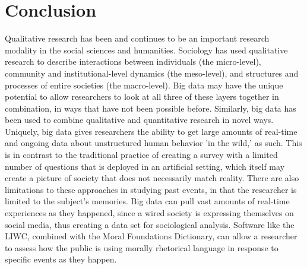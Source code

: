 \documentclass[sigconf]{acmart}
\begin{document}
\section{Conclusion}
Qualitative research has been and continues to be an important research modality in the social sciences and humanities.  Sociology has used qualitative research to describe interactions between individuals (the micro-level), community and institutional-level dynamics (the meso-level), and structures and processes of entire societies (the macro-level).  Big data may have the unique potential to allow researchers to look at all three of these layers together in combination, in ways that have not been possible before. Similarly, big data has been used to combine qualitative and quantitative research in novel ways.  Uniquely, big data gives researchers the ability to get large amounts of real-time and ongoing data about unstructured human behavior 'in the wild,' as such.  This is in contrast to the traditional practice of creating a survey with a limited number of questions that is deployed in an artificial setting, which itself may create a picture of society that does not necessarily match reality.  There are also limitations to these approaches in studying past events, in that the researcher is limited to the subject's memories.  Big data can pull vast amounts of real-time experiences as they happened, since a wired society is expressing themselves on social media, thus creating a data set for sociological analysis.  Software like the LIWC, combined with the Moral Foundations Dictionary, can allow a researcher to assess how the public is using morally rhetorical language in response to specific events as they happen.


 
\end{document}
